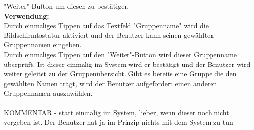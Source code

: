 "Weiter"-Button um diesen zu bestätigen\\
\textbf{Verwendung:}\\
Durch einmaliges Tippen auf das Textfeld "Gruppenname" wird die Bildschirmtastatur aktiviert und der Benutzer kann seinen gewählten Gruppennamen eingeben.\\
Durch einmaliges Tippen auf den "Weiter"-Button wird dieser Gruppenname überprüft. Ist dieser einmalig im System wird er bestätigt und der Benutzer wird weiter geleitet zu der Gruppenübersicht. Gibt es bereits eine Gruppe die den gewählten Namen trägt, wird der Benutzer aufgefordert einen anderen Gruppennamen auszuwählen.\\ \\

KOMMENTAR
- statt einmalig im System, lieber, wenn dieser noch nicht vergeben ist. Der Benutzer hat ja im Prinzip nichts mit dem System zu tun


